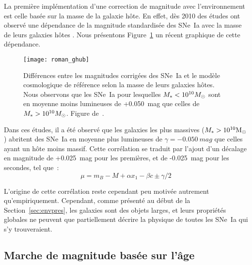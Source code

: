 \documentclass[../main/main.tex]{subfiles}
\begin{document}

La première implémentation d'une correction de magnitude avec l'environnement
est celle basée sur la masse de la galaxie hôte. En effet, dès 2010 des études
ont observé une dépendance de la magnitude standardisée des SNe~Ia avec la masse
de leurs galaxies hôtes \citep[voir par exemple][]{kelly2010, betoule2014}. Nous
présentons Figure~\ref{fig:mbmass} un récent graphique de cette dépendance.

\begin{figure}[htb]
    \centering
    \texttt{[image: roman\_ghub]}
    \caption[Marche de magnitude basée sur la masse]{Différences entre les
        magnitudes corrigées des SNe~Ia et le modèle cosmologique de référence
        selon la masse de leurs galaxies hôtes. Nous observons que les SNe~Ia
        pour lesquelles $M_* < 10^{10}\Msun$ sont en moyenne moins lumineuses de
        +\SI{0.050}{mag} que celles de $M_* > 10^{10}\Msun$. Figure
    de~\cite{roman2018}.}
    \label{fig:mbmass}
\end{figure}

Dans ces études, il a été observé que les galaxies les plus
massives ($M_* > 10^{10}\si{\Msun}$) abritent des SNe~Ia en moyenne plus
lumineuses de $\gamma = -\SI{0.050}{mag}$ que celles ayant un hôte moins massif.
Cette corrélation se traduit par l'ajout d'un décalage en magnitude de
+\SI{0.025}{mag} pour les premières, et de -\SI{0.025}{mag} pour les secondes,
tel que~:
\begin{equation}\label{eq:mbmass}
    \mu = m_B - M + \alpha x_1 - \beta c \pm \gamma/2
\end{equation}

L'origine de cette corrélation reste cependant peu motivée autrement
qu'empiriquement. Cependant, comme présenté au début de la
Section~\ref{sec:envpres}, les galaxies sont des objets larges, et leurs
propriétés globales ne peuvent que partiellement décrire la physique de toutes
les SNe~Ia qui s'y trouveraient. 

\subsection{Marche de magnitude basée sur l'âge}\label{ssec:astep}
\end{document}
